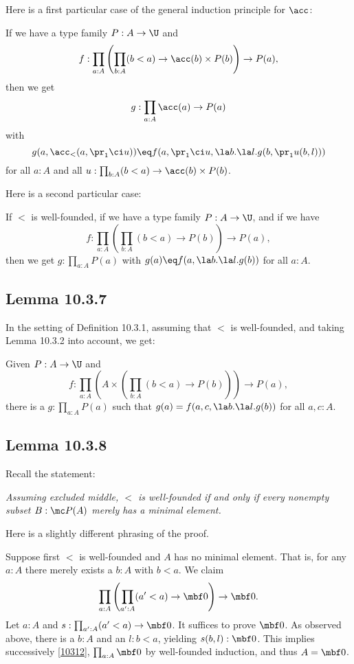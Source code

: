\documentclass[12pt]{article}
\begin{document}
Here is a first particular case of the general induction principle for $\acc$:

If we have a type family $P:A\to\U$ and %
$$
f:\prod_{a:A}\left(\prod_{b:A}(b<a)\to\acc(b)\times P(b)\right)\to P(a),%
$$ 
then we get 
$$
g:\prod_{a:A}\acc(a)\to P(a)
$$
with
$$
g(a,\acc_<(a,\pr_1\ci u))\eq f(a,\pr_1\ci u,\la b.\la l.g(b,\pr_1 u(b,l)))
$$
for all $a:A$ and all $u:\prod_{b:A}(b<a)\to\acc(b)\times P(b)$. 

Here is a second particular case:

If $<$ is well-founded, if we have a type family $P:A\to\U$, and if we have 
$$
f:\prod_{a:A}\left(\prod_{b:A}(b<a)\to P(b)\right)\to P(a),
$$
then we get $g:\prod_{a:A}P(a)$ with $g(a)\eq f(a,\la b.\la l.g(b))$ for all $a:A$.


\subsection{Lemma 10.3.7}\label{s1037}

In the setting of Definition 10.3.1, assuming that $<$ is well-founded, and taking Lemma 10.3.2 into account, we get:

Given $P:A\to\U$ and
$$%
f:\prod_{a:A}\left(A\times\left(\prod_{b:A}(b<a)\to P(b)\right)\right)\to P(a),
$$%
there is a $g:\prod_{a:A}P(a)$ such that $g(a)=f(a,c,\la b.\la l.g(b))$ for all $a,c:A$.


\subsection{Lemma 10.3.8}

Recall the statement: 

\emph{Assuming excluded middle, $<$ is well-founded if and only if every nonempty subset $B:\mc P(A)$ merely has a minimal element.} 

Here is a slightly different phrasing of the proof.

Suppose first $<$ is well-founded and $A$ has no minimal element. That is, for any $a:A$ there merely exists a $b:A$ with $b<a$. We claim 
\begin{equation}\label{10312}
\prod_{a:A}\left(\prod_{a':A}(a'<a)\to\mbf0\right)\to\mbf0.
\end{equation}
Let $a:A$ and $s:\prod_{a':A}(a'<a)\to\mbf0$. It suffices to prove $\mbf0$. As observed above, there is a $b:A$ and an $l:b<a$, yielding $s(b,l):\mbf0$. This implies successively \eqref{10312}, $\prod_{a:A}\mbf0$ by well-founded induction, and thus $A=\mbf0$. 
\end{document}
